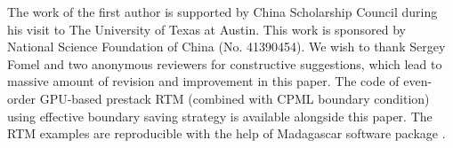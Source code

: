 The work of the first author is supported by China Scholarship Council during his visit to The University of Texas at Austin. This work is sponsored by National Science Foundation of China (No. 41390454). We wish to thank Sergey Fomel and two anonymous reviewers for constructive suggestions, which lead to massive amount of revision and improvement in this paper. The code of even-order GPU-based prestack RTM (combined with CPML boundary condition) using effective boundary saving strategy is available alongside this paper. The RTM examples are reproducible with the help of Madagascar software package \citep{m8r}.



